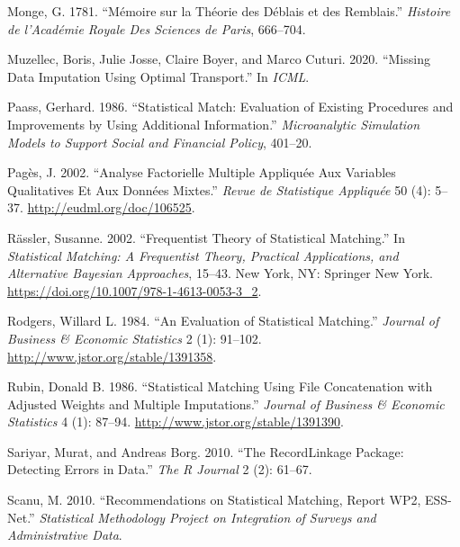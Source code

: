 \begin{CSLReferences}{1}{0}
\leavevmode{}%
Monge, G. 1781. {``{Mémoire sur la Théorie des Déblais et des Remblais}.''} \emph{Histoire de l'Académie Royale Des Sciences de Paris}, 666--704.

\leavevmode{}%
Muzellec, Boris, Julie Josse, Claire Boyer, and Marco Cuturi. 2020. {``Missing Data Imputation Using Optimal Transport.''} In \emph{ICML}.

\leavevmode{}%
Paass, Gerhard. 1986. {``Statistical Match: Evaluation of Existing Procedures and Improvements by Using Additional Information.''} \emph{Microanalytic Simulation Models to Support Social and Financial Policy}, 401--20.

\leavevmode{}%
Pagès, J. 2002. {``Analyse Factorielle Multiple Appliquée Aux Variables Qualitatives Et Aux Données Mixtes.''} \emph{Revue de Statistique Appliquée} 50 (4): 5--37. \url{http://eudml.org/doc/106525}.

\leavevmode{}%
Rässler, Susanne. 2002. {``Frequentist Theory of Statistical Matching.''} In \emph{Statistical Matching: A Frequentist Theory, Practical Applications, and Alternative Bayesian Approaches}, 15--43. New York, NY: Springer New York. \url{https://doi.org/10.1007/978-1-4613-0053-3_2}.

\leavevmode{}%
Rodgers, Willard L. 1984. {``An Evaluation of Statistical Matching.''} \emph{Journal of Business \& Economic Statistics} 2 (1): 91--102. \url{http://www.jstor.org/stable/1391358}.

\leavevmode{}%
Rubin, Donald B. 1986. {``Statistical Matching Using File Concatenation with Adjusted Weights and Multiple Imputations.''} \emph{Journal of Business \& Economic Statistics} 4 (1): 87--94. \url{http://www.jstor.org/stable/1391390}.

\leavevmode{}%
Sariyar, Murat, and Andreas Borg. 2010. {``The RecordLinkage Package: Detecting Errors in Data.''} \emph{The R Journal} 2 (2): 61--67.

\leavevmode{}%
Scanu, M. 2010. {``Recommendations on Statistical Matching, Report WP2, ESS-Net.''} \emph{Statistical Methodology Project on Integration of Surveys and Administrative Data}.


\end{CSLReferences}
